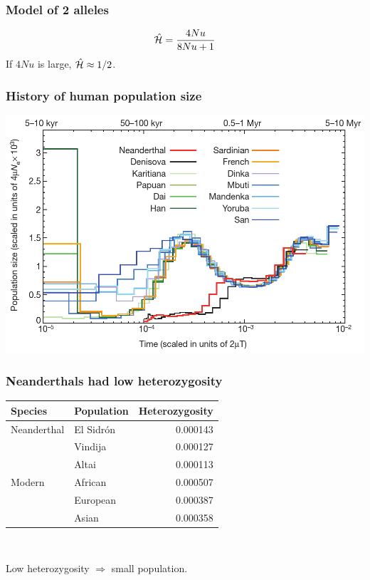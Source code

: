 \begin{frame}
\frametitle{Model of 2 alleles}
\[
\hat{\mathcal{H}} = \frac{4Nu}{8Nu + 1}
\]
If $4Nu$ is large, $\hat{\mathcal{H}} \approx 1/2$.
\end{frame}

\begin{frame}
\frametitle{History of human population size}
{\centering
\includegraphics[width=\linewidth]{Prufer-pophist.png}\\}
\end{frame}
\begin{frame}
\frametitle{Neanderthals had low heterozygosity}
{\centering
\begin{tabular}{llr}
Species & Population & Heterozygosity\\
\hline
Neanderthal     & El Sidr{\'o}n & 0.000143\\
                & Vindija       & 0.000127\\
                & Altai         & 0.000113\\[1ex]
Modern          & African       & 0.000507\\
                & European      & 0.000387\\
                & Asian         & 0.000358
\end{tabular}\\[2ex]}

Low heterozygosity $\Rightarrow$ small population.
\end{frame}

